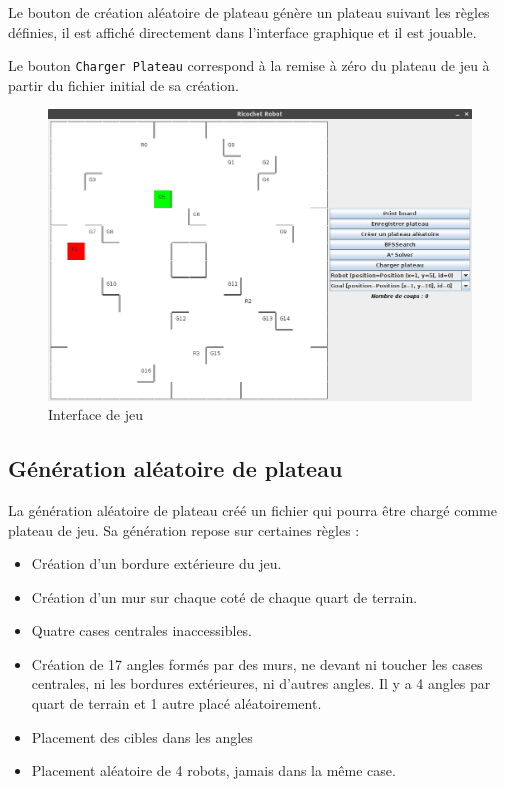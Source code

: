 \documentclass[a4paper]{article} %
\begin{document}
	Le bouton de création aléatoire de plateau génère un plateau suivant les règles définies, il est affiché directement dans l'interface graphique et il est jouable.
	
	Le bouton \texttt{Charger Plateau} correspond à la remise à zéro du plateau de jeu à partir du fichier initial de sa création.

\begin{figure}[htpb]
	\begin{center}
	\includegraphics[scale=0.4]{./images/interface.png}
	\caption{Interface de jeu}\label{interface}
	\end{center}
\end{figure}

	\subsection{Génération aléatoire de plateau}
La génération aléatoire de plateau créé un fichier qui pourra être chargé comme plateau de jeu. Sa génération repose sur certaines règles :
\begin{itemize}
\item Création d'un bordure extérieure du jeu.
\item Création d'un mur sur chaque coté de chaque quart de terrain.
\item Quatre cases centrales inaccessibles.
\item Création de 17 angles formés par des murs, ne devant ni toucher les cases centrales, ni les bordures extérieures, ni d'autres angles. Il y a 4 angles par quart de terrain et 1 autre placé aléatoirement.
\item Placement des cibles dans les angles
\item Placement aléatoire de 4 robots, jamais dans la même case.
\end{itemize}
\end{document}
